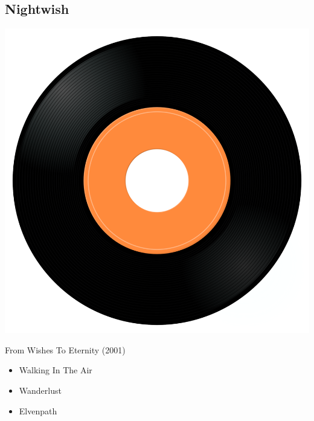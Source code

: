 \subsection{Nightwish}

\begin{minipage}[t]{0.25\textwidth}
\captionsetup{type=figure}
\includegraphics[width=\textwidth]{Images/cover.png}
\caption*{From Wishes To Eternity (2001)}
\end{minipage}
\begin{minipage}[t]{0.25\textwidth}\vspace{0pt}
\begin{itemize}[nosep,leftmargin=1em,labelwidth=*,align=left]
	\setlength{\itemsep}{0pt}
	\item Walking In The Air
	\item Wanderlust
	\item Elvenpath
\end{itemize}
\end{minipage}
